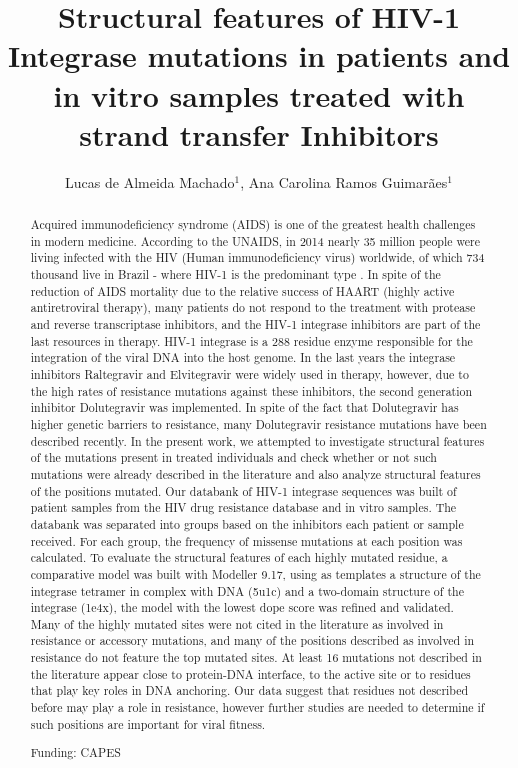 \documentclass[twoside]{article}
\title{\vspace{-15mm}\fontsize{24pt}{10pt}\selectfont\textbf{Structural features of HIV-1 Integrase mutations in patients and in vitro samples treated with strand transfer Inhibitors}} %
\author{Lucas de Almeida Machado$^1$, Ana Carolina Ramos Guimar\~aes$^1$}
\affil{1 FIOCRUZ\\ }
\date{}
\begin{document}
\maketitle %

\thispagestyle{fancy} %


\begin{abstract}
Acquired immunodeficiency syndrome (AIDS) is one of the greatest health challenges in modern medicine. According to the UNAIDS, in 2014  nearly 35 million people were living infected with the HIV (Human immunodeficiency virus) worldwide, of which 734 thousand live in Brazil - where HIV-1 is the predominant type . In spite of the reduction of AIDS mortality due to the relative success of HAART (highly active antiretroviral therapy), many patients do not respond to the treatment with protease and reverse transcriptase inhibitors, and the HIV-1 integrase inhibitors are part of the last resources in therapy. HIV-1 integrase is a 288 residue enzyme responsible for the integration of the viral DNA into the host genome. In the last years the integrase inhibitors Raltegravir and Elvitegravir were widely used in therapy, however, due to the high rates of resistance mutations  against these inhibitors, the second generation inhibitor Dolutegravir was implemented. In spite of the fact that Dolutegravir has higher genetic barriers to resistance, many Dolutegravir resistance mutations have been described recently. In the present work, we attempted to investigate  structural features of the mutations present in treated individuals and check whether or not such mutations were already described in the literature and also analyze structural features of the positions mutated. Our databank of HIV-1 integrase sequences was built of patient samples from the HIV drug resistance database and in vitro samples. The databank was separated into groups based on the inhibitors each patient or sample received. For each group, the frequency of missense mutations at each position was calculated. To evaluate  the structural features of each highly mutated residue, a comparative model was built with Modeller 9.17, using as templates a structure of the integrase tetramer in complex with DNA (5u1c) and a two-domain structure of the integrase (1e4x), the model with the lowest dope score was refined and validated. Many of the highly mutated sites were not cited in the literature as involved in resistance or accessory mutations, and many of the positions described as involved in resistance do not feature the top mutated sites. At least 16 mutations not described in the literature appear close to protein-DNA interface, to the active site or to residues that play key roles in DNA anchoring. Our data suggest that residues not described before may play a role in resistance, however further studies are needed to determine if such positions are important for viral fitness.

Funding: CAPES
\end{abstract}
\end{document}
